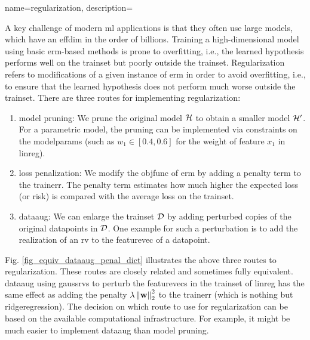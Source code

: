{name={regularization}, 
	description={A key challenge of modern \gls{ml} applications is that they often 
		use large \glspl{model}, which have an \gls{effdim} in the order of billions. 
		Training a high-dimensional \gls{model} using basic \gls{erm}-based methods
		is prone to \gls{overfitting}, i.e., the learned \gls{hypothesis} performs well on the \gls{trainset} 
		but poorly outside the \gls{trainset}. Regularization refers to modifications of a given instance 
		of \gls{erm} in order to avoid \gls{overfitting}, i.e., to ensure that the learned \gls{hypothesis} does 
		not perform much worse outside the \gls{trainset}. There are three routes for implementing 
		regularization: 
		\begin{enumerate}[label=\arabic*)]
			\item {\Gls{model} pruning:} We prune the original \gls{model} $\mathcal{H}$ to obtain a 
			smaller \gls{model} $\mathcal{H}'$. For a parametric \gls{model}, the pruning can be 
			implemented via constraints on the \gls{modelparams} (such as $w_{1} \in [0.4,0.6]$ for 
			the weight of \gls{feature} $x_{1}$ in \gls{linreg}).
			\item {\Gls{loss} penalization:} We modify the \gls{objfunc} of \gls{erm} by adding a 
			penalty term to the \gls{trainerr}. The penalty term estimates how much higher the expected \gls{loss} (or \gls{risk}) 
			is compared with the average \gls{loss} on the \gls{trainset}. 
			\item {\Gls{dataaug}:} We can enlarge the \gls{trainset} $\mathcal{D}$ by adding 
			perturbed copies of the original \glspl{datapoint} in $\mathcal{D}$. One example for such 
			a perturbation is to add the \gls{realization} of an \gls{rv} to the \gls{featurevec} 
			of a \gls{datapoint}. 
		\end{enumerate} 
		Fig. \ref{fig_equiv_dataaug_penal_dict} illustrates the above three routes to regularization. 
		These routes are closely related and sometimes fully equivalent. \Gls{dataaug} using \glspl{gaussrv} 
		to perturb the \glspl{featurevec} in the \gls{trainset} of \gls{linreg} 
		has the same effect as adding the penalty 
		$\lambda \left\Vert {{\bf w}} \right\Vert_{2}^2$ to the \gls{trainerr} (which is nothing but \gls{ridgeregression}). 
        		The decision on which route to use for regularization can be based on the 
        		available computational infrastructure. For example, it might be much easier to 
        		implement \gls{dataaug} than \gls{model} pruning. 
		\begin{figure}[H]

\end{figure}}}
